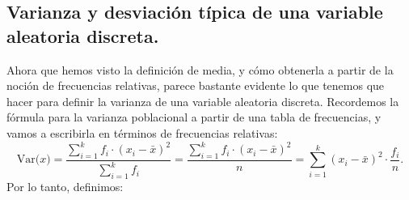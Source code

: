 \subsection{Varianza y desviación típica de una variable aleatoria discreta.}
\label{cap04:subsec:VarianzaDesvTipicaVariableAleatoriaDiscreta}

Ahora que hemos visto la definición de media, y cómo obtenerla a partir de la noción de frecuencias relativas, parece bastante evidente lo que tenemos que hacer para definir la varianza de una variable aleatoria discreta. Recordemos la fórmula para la varianza poblacional a partir de una tabla de frecuencias, y vamos a escribirla en términos de frecuencias relativas:
    \[
    \mbox{Var($x$)}=\dfrac{\displaystyle\sum_{i=1}^k{ f_i\cdot}(x_i-\bar x)^2}{{ \displaystyle\sum_{i=1}^k f_i}}=
    \dfrac{\displaystyle\sum_{i=1}^k{ f_i\cdot}(x_i-\bar x)^2}{n}=
    \displaystyle\sum_{i=1}^k{(x_i-\bar x)^2\cdot}\dfrac{f_i}{n}.
   \]
Por lo tanto, definimos:
%
%
    \begin{center}
    \end{center}
